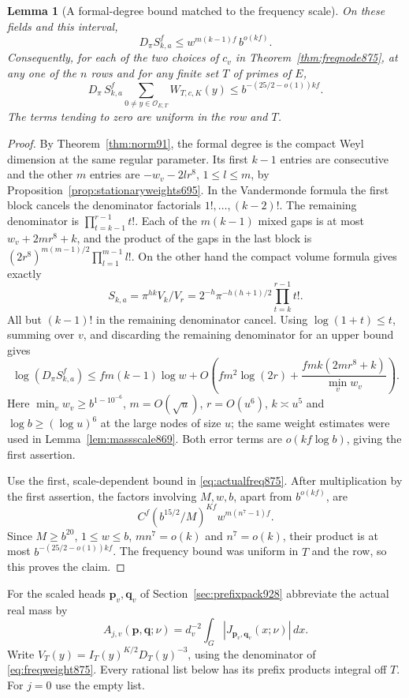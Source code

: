 \documentclass[a4paper,11pt]{article}
\newtheorem{lemma}[proposition]{Lemma}
\theoremstyle{definition}
\theoremstyle{remark}
\numberwithin{equation}{section}
\begin{document}
\begin{lemma}[A formal-degree bound matched to the frequency scale]
\leavevmode\label{lem:identityscale929}
On these fields and this interval,
\[
          D_\pi S_{k,a}^f
           \le w^{m(k-1)f}\,b^{o(kf)}.
\]
Consequently, for each of the two choices of \(c_v\) in
Theorem~\ref{thm:freqnode875}, at any one of the \(n\) rows and
for any finite set \(T\) of primes of \(E\),
\[
 D_\pi\, S_{k,a}^f
       \sum_{0\ne y\in\mathcal O_{E,T}} W_{T,c,K}(y)
          \le b^{-(25/2-o(1))kf}.
\]
The terms tending to zero are uniform in the row and \(T\).
\end{lemma}
\begin{proof}
By Theorem~\ref{thm:norm91}, the formal degree is the compact
Weyl dimension at the same regular parameter. Its first \(k-1\)
entries are consecutive and the other \(m\) entries are
\(-w_v-2lr^8\), \(1\le l\le m\), by
Proposition~\ref{prop:stationaryweights695}. In the Vandermonde
formula the first block cancels the denominator factorials
\(1!,\ldots,(k-2)!\). The remaining denominator is
\(\prod_{t=k-1}^{r-1}t!\). Each of the \(m(k-1)\) mixed gaps
is at most \(w_v+2mr^8+k\), and the product of the gaps in
the last block is
\((2r^8)^{m(m-1)/2}\prod_{l=1}^{m-1}l!\).
On the other hand the compact volume formula gives exactly
\[
 S_{k,a}=\pi^{hk}V_k/V_r
           =2^{-h}\pi^{-h(h+1)/2}\prod_{t=k}^{r-1}t!.
\]
All but \((k-1)!\) in the remaining denominator cancel.
Using \(\log(1+t)\le t\), summing over \(v\), and discarding
the remaining denominator for an upper bound gives
\[
 \log(D_\pi S_{k,a}^f)
 \le fm(k-1)\log w+
 O\!\left(fm^2\log(2r)+\frac{fm k(2mr^8+k)}{\min_v w_v}\right).
\]
Here \(\min_v w_v\ge b^{1-10^{-6}}\), \(m=O(\sqrt u)\),
\(r=O(u^6)\), \(k\asymp u^5\) and \(\log b\ge(\log u)^6\)
at the large nodes of size \(u\); the same weight estimates
were used in Lemma~\ref{lem:massscale869}. Both error terms are
\(o(kf\log b)\), giving the first assertion.

Use the first, scale-dependent bound in \eqref{eq:actualfreq875}.
After multiplication by the first assertion, the factors involving
\(M,w,b\), apart from \(b^{o(kf)}\), are
\[
          C^f (b^{15/2}/M)^{Kf}w^{m(n^7-1)f}.
\]
Since \(M\ge b^{20}\), \(1\le w\le b\), \(m n^7=o(k)\)
and \(n^7=o(k)\), their product is at most
\(b^{-(25/2-o(1))kf}\). The frequency bound was uniform
in \(T\) and the row, so this proves the claim.
\end{proof}

For the scaled heads \(\mathbf p_v,\mathbf q_v\) of
Section~\ref{sec:prefixpack928} abbreviate the actual real mass by
\[
 A_{j,v}(\mathbf p,\mathbf q;\nu)=
     d_v^{-2}\int_G |J_{\mathbf p_v,\mathbf q_v}(x;\nu)|\,dx.
\]
Write \(V_T(y)=I_T(y)^{K/2}D_T(y)^{-3}\), using the denominator
of \eqref{eq:freqweight875}. Every rational list below has its
prefix products integral off \(T\). For \(j=0\) use the empty list.
\end{document}
